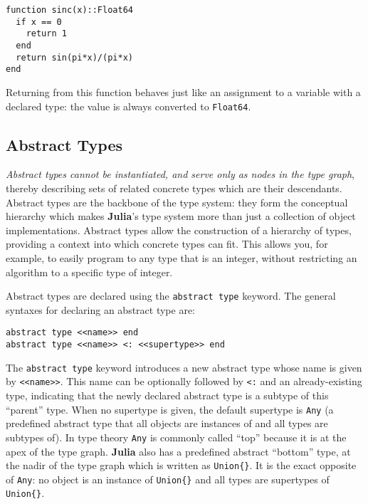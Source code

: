 \documentclass[
]{article}
\begin{document}
\begin{verbatim}
function sinc(x)::Float64
  if x == 0
    return 1
  end
  return sin(pi*x)/(pi*x)
end
\end{verbatim}

Returning from this function behaves just like an assignment to a
variable with a declared type: the value is always converted to
\texttt{Float64}.

\hypertarget{abstract-types}{%
\subsection{Abstract Types}\label{abstract-types}}

\emph{Abstract types cannot be instantiated, and serve only as nodes in
the type graph}, thereby describing sets of related concrete types which
are their descendants. Abstract types are the backbone of the type
system: they form the conceptual hierarchy which makes \textbf{Julia}'s
type system more than just a collection of object implementations.
Abstract types allow the construction of a hierarchy of types, providing
a context into which concrete types can fit. This allows you, for
example, to easily program to any type that is an integer, without
restricting an algorithm to a specific type of integer.

Abstract types are declared using the \texttt{abstract\ type} keyword.
The general syntaxes for declaring an abstract type are:

\begin{verbatim}
abstract type <<name>> end
abstract type <<name>> <: <<supertype>> end
\end{verbatim}

The \texttt{abstract\ type} keyword introduces a new abstract type whose
name is given by
\texttt{\textless{}\textless{}name\textgreater{}\textgreater{}}. This
name can be optionally followed by \texttt{\textless{}:} and an
already-existing type, indicating that the newly declared abstract type
is a subtype of this ``parent'' type. When no supertype is given, the
default supertype is \texttt{Any} (a predefined abstract type that all
objects are instances of and all types are subtypes of). In type theory
\texttt{Any} is commonly called ``top'' because it is at the apex of the
type graph. \textbf{Julia} also has a predefined abstract ``bottom''
type, at the nadir of the type graph which is written as
\texttt{Union\{\}}. It is the exact opposite of \texttt{Any}: no object
is an instance of \texttt{Union\{\}} and all types are supertypes of
\texttt{Union\{\}}.
\end{document}
